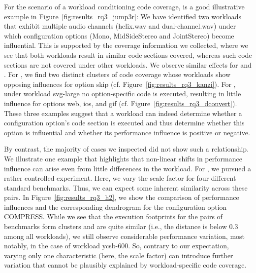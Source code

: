For the scenario of a workload conditioning code coverage, \jumper is a good illustrative example in Figure~\ref{fig:results_rq3_jump3r}: We have identified two workloads that exhibit multiple audio channels (\textsf{helix.wav} and \textsf{dual-channel.wav}) under which configuration options (\textsf{Mono, MidSideStereo and JointStereo}) become influential. This is supported by the coverage information we collected, where we see that both workloads result in similar code sections covered, whereas such code sections are not covered under other workloads. We observe similar effects for \kanzi and \dconvert. For \kanzi, we find two distinct clusters of code coverage whose workloads show opposing influences for option \textsf{skip} (cf. Figure~\ref{fig:results_rq3_kanzi}). For \dconvert, under workload \textsf{svg-large} no option-specific code is executed, resulting in little influence for options \textsf{web, ios, and gif} (cf. Figure~\ref{fig:results_rq3_dconvert}). These three examples suggest that a workload can indeed determine whether a configuration option's code section is executed and thus determine whether this option is influential and whether its performance influence is positive or negative. 

By contrast, the majority of cases we inspected did not show such a relationship. We illustrate one example that highlights that non-linear shifts in performance influence can arise even from little differences in the workload. For \htwo, we pursued a rather controlled experiment. Here, we vary the scale factor for four different standard benchmarks. Thus, we can expect some inherent similarity across these pairs. In Figure~\ref{fig:results_rq3_h2}, we show the comparison of performance influences and the corresponding dendrogram for the configuration option \textsf{COMPRESS}. While we see that the execution footprints for the pairs of benchmarks form clusters and are quite similar (i.e., the distance is below 0.3 among all workloads), we still observe considerable performance variation, most notably, in the case of workload \textsf{ycsb-600}. So, contrary to our expectation, varying only one characteristic (here, the scale factor) can introduce further variation that cannot be plausibly explained by workload-specific code coverage. 

